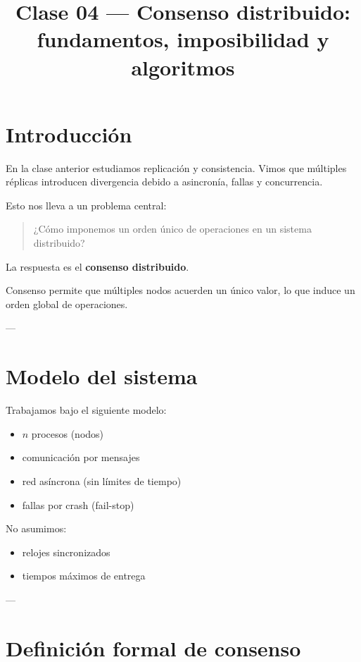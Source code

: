 \documentclass[variant=apuntes,cover=institutional,mode=screen]{ua-engineering-v6-article}
\title{Clase 04 --- Consenso distribuido: fundamentos, imposibilidad y algoritmos}
\author{\UAProfessor}
\date{\UADate}
\begin{document}
\maketitle

\section{Introducción}

En la clase anterior estudiamos replicación y consistencia. Vimos que múltiples réplicas introducen divergencia debido a asincronía, fallas y concurrencia.

Esto nos lleva a un problema central:

\begin{quote}
¿Cómo imponemos un orden único de operaciones en un sistema distribuido?
\end{quote}

La respuesta es el \textbf{consenso distribuido}.

\begin{uakeybox}
Consenso permite que múltiples nodos acuerden un único valor, lo que induce un orden global de operaciones.
\end{uakeybox}

---

\section{Modelo del sistema}

Trabajamos bajo el siguiente modelo:

\begin{itemize}
\item $n$ procesos (nodos)
\item comunicación por mensajes
\item red asíncrona (sin límites de tiempo)
\item fallas por crash (fail-stop)
\end{itemize}

No asumimos:

\begin{itemize}
\item relojes sincronizados
\item tiempos máximos de entrega
\end{itemize}

---

\section{Definición formal de consenso}
\end{document}
